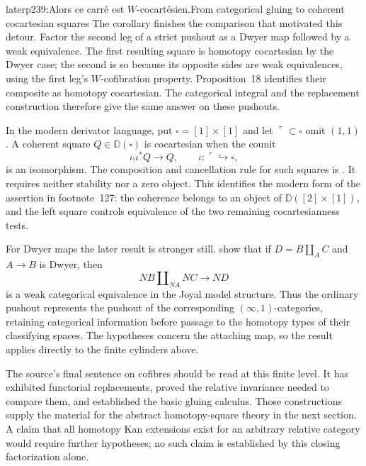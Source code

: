 \begin{dcomment}{later}{p239:Alors ce carré est $W$-cocartésien.}{From categorical gluing to coherent cocartesian squares}
The corollary finishes the comparison that motivated this detour. Factor the second leg of a strict pushout as a Dwyer map followed by a weak equivalence. The first resulting square is homotopy cocartesian by the Dwyer case; the second is so because its opposite sides are weak equivalences, using the first leg's $W$-cofibration property. Proposition~18 identifies their composite as homotopy cocartesian. The categorical integral and the replacement construction therefore give the same answer on these pushouts.

In the modern derivator language, put $\square=[1]\times[1]$ and let $\ulcorner\subset\square$ omit $(1,1)$. A coherent square $Q\in\mathbb D(\square)$ is cocartesian when the counit
\[
 \iota_!\iota^*Q\longrightarrow Q,
 \qquad \iota:\ulcorner\hookrightarrow\square,
\]
is an isomorphism. The composition and cancellation rule for such squares is \citet[Proposition~3.13]{Groth2013}. It requires neither stability nor a zero object. This identifies the modern form of the assertion in footnote~127: the coherence belongs to an object of $\mathbb D([2]\times[1])$, and the left square controls equivalence of the two remaining cocartesianness tests.

For Dwyer maps the later result is stronger still. \citet[Theorems~1.5--1.6, arXiv version~3]{HackneyOzornovaRiehlRovelli2024} show that if $D=B\amalg_A C$ and $A\to B$ is Dwyer, then
\[
 NB\amalg_{NA}NC\longrightarrow ND
\]
is a weak categorical equivalence in the Joyal model structure. Thus the ordinary pushout represents the pushout of the corresponding $(\infty,1)$-categories, retaining categorical information before passage to the homotopy types of their classifying spaces. The hypotheses concern the attaching map, so the result applies directly to the finite cylinders above.

The source's final sentence on cofibres should be read at this finite level. It has exhibited functorial replacements, proved the relative invariance needed to compare them, and established the basic gluing calculus. Those constructions supply the material for the abstract homotopy-square theory in the next section. A claim that all homotopy Kan extensions exist for an arbitrary relative category would require further hypotheses; no such claim is established by this closing factorization alone.
\end{dcomment}


